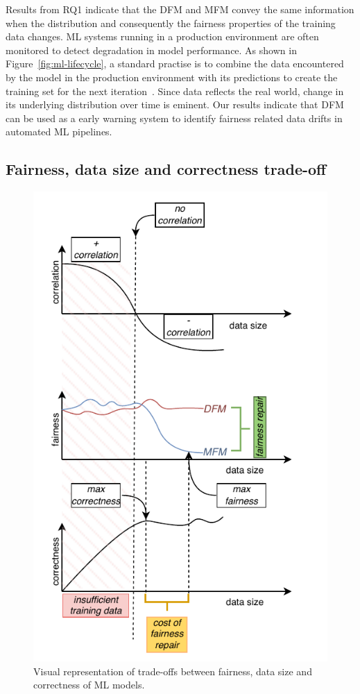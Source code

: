 \documentclass[conference,review,anonymous]{IEEEtran}
\begin{document}
Results from RQ1 indicate that the DFM and MFM convey the same
information when the distribution and consequently the fairness
properties of the training data changes. ML systems running in a
production environment are often monitored to detect degradation in
model performance. As shown in Figure \ref{fig:ml-lifecycle}, a
standard practise is to combine the data encountered by the model in
the production environment with its predictions to create the training
set for the next iteration \cite{biessmann2021automated}. Since data
reflects the real world, change in its underlying distribution over
time is eminent. Our results indicate that DFM can be used as a early
warning system to identify fairness related data drifts in automated
ML pipelines.

\subsection{Fairness, data size and correctness trade-off}\label{sec:discuss-fair-eff-perf-trade}

\begin{figure}
  \centering
  \includegraphics[width=\linewidth]{tradeoff.pdf}
  \caption{Visual representation of trade-offs between fairness, data
    size and correctness of ML models.}
  \label{fig:tradeoff}
\end{figure}
\end{document}
